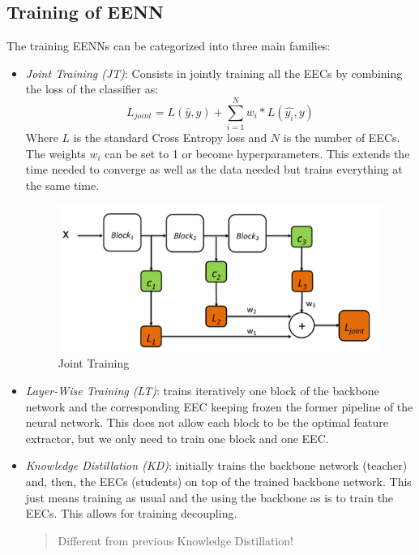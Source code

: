 \documentclass{article}
\begin{document}
    \subsection{Training of EENN}
      The training EENNs can be categorized into three main families:
      \begin{itemize}
        \item \emph{Joint Training (JT)}: Consists in jointly training all the EECs by combining the loss of the classifier as:
        \begin{equation}
          L_{joint} = L(\hat{y},y) +\sum_{i=1}^{N} w_i * L(\hat{y_i},y)
        \end{equation} 
        Where $L$ is the standard Cross Entropy loss and $N$ is the number of EECs. The weights $w_i$ can be set to 1 or become hyperparameters. This extends the time needed to converge as well as the data needed but trains everything at the same time.
        \begin{figure}[H]
          \includegraphics[scale=0.35]{../Images/JointTraining.png}
          \centering
          \caption{Joint Training}
        \end{figure}
        
        \item \emph{Layer-Wise Training (LT)}: trains iteratively one block of the backbone network and the corresponding EEC keeping frozen the former pipeline of the neural network. This does not allow each block to be the optimal feature extractor, but
        we only need to train one block and one EEC. 
        \item \emph{Knowledge Distillation (KD)}: initially trains the backbone network (teacher) and, then, the EECs (students) on top of the trained backbone network. This just means training as usual and the using the backbone as is to train the EECs. This allows for training decoupling.
        \begin{quote}
          \centering
          Different from previous Knowledge Distillation!
        \end{quote}
      \end{itemize}
\end{document}
